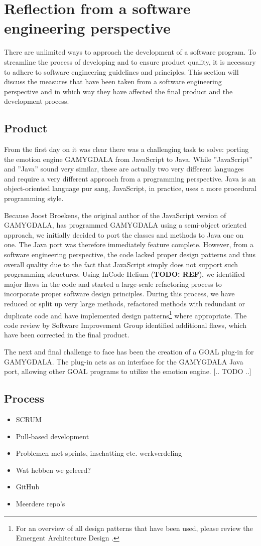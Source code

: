 \section{Reflection from a software engineering perspective}
There are unlimited ways to approach the development of a software program. To streamline the process of developing and to ensure product quality, it is necessary to adhere to software engineering guidelines and principles. This section will discuss the measures that have been taken from a software engineering perspective and in which way they have affected the final product and the development process.


\subsection{Product}
From the first day on it was clear there was a challenging task to solve: porting the emotion engine GAMYGDALA from JavaScript to Java. While ''JavaScript'' and ''Java'' sound very similar, these are actually two very different languages and require a very different approach from a programming perspective. Java is an object-oriented language pur sang, JavaScript, in practice, uses a more procedural programming style.

Because Joost Broekens, the original author of the JavaScript version of GAMYGDALA, has programmed GAMYGDALA using a semi-object oriented approach, we initially decided to port the classes and methods to Java one on one. The Java port was therefore immediately feature complete. However, from a software engineering perspective, the code lacked proper design patterns and thus overall quality due to the fact that JavaScript simply does not support such  programming structures. Using InCode Helium (\textbf{TODO: REF}), we identified major flaws in the code and started a large-scale refactoring process to incorporate proper software design principles. During this process, we have reduced or split up very large methods, refactored methods with redundant or duplicate code and have implemented design patterns\footnote{For an overview of all design patterns that have been used, please review the Emergent Architecture Design \citep{ead}.} where appropriate. The code review by Software Improvement Group identified additional flaws, which have been corrected in the final product.

The next and final challenge to face has been the creation of a GOAL plug-in for GAMYGDALA. The plug-in acts as an interface for the GAMYGDALA Java port, allowing other GOAL programs to utilize the emotion engine. [.. TODO ..]

\subsection{Process}
\begin{itemize}
\item SCRUM
\item Pull-based development
\item Problemen met sprints, inschatting etc. werkverdeling
\item Wat hebben we geleerd?
\item GitHub
\item Meerdere repo's
\end{itemize}